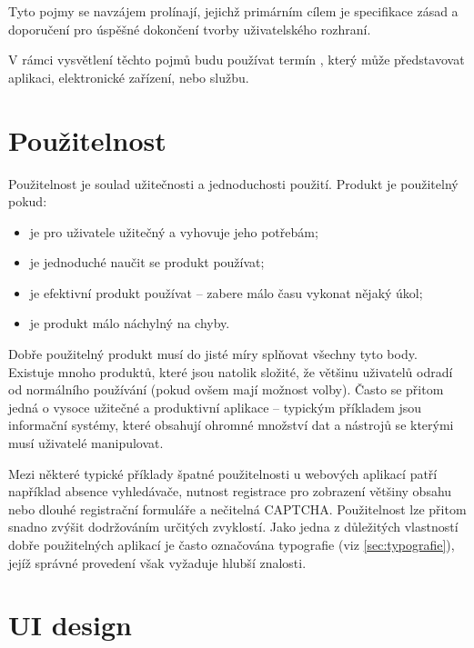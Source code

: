 Tyto pojmy se navzájem prolínají, jejichž primárním cílem je specifikace zásad a doporučení pro úspěšné dokončení tvorby uživatelského rozhraní.

V rámci vysvětlení těchto pojmů budu používat termín , který může představovat aplikaci, elektronické zařízení, nebo službu.

\section{Použitelnost}
\label{sec:usability}

Použitelnost je soulad užitečnosti a jednoduchosti použití. Produkt je použitelný pokud:

\begin{itemize}
    \item je pro uživatele užitečný a vyhovuje jeho potřebám;
    \item je jednoduché naučit se produkt používat;
    \item je efektivní produkt používat -- zabere málo času vykonat nějaký úkol;
    \item je produkt málo náchylný na chyby.
\end{itemize}

Dobře použitelný produkt musí do jisté míry splňovat všechny tyto body. Existuje mnoho produktů, které jsou natolik složité, že většinu uživatelů odradí od normálního používání (pokud ovšem mají možnost volby). Často se přitom jedná o vysoce užitečné a produktivní aplikace -- typickým příkladem jsou informační systémy, které obsahují ohromné množství dat a nástrojů se kterými musí uživatelé manipulovat.

Mezi některé typické příklady špatné použitelnosti u webových aplikací patří například absence vyhledávače, nutnost registrace pro zobrazení většiny obsahu nebo dlouhé registrační formuláře a nečitelná CAPTCHA\footnotemark[1]. Použitelnost lze přitom snadno zvýšit dodržováním určitých zvyklostí. Jako jedna z důležitých vlastností dobře použitelných aplikací je často označována typografie (viz \ref{sec:typografie}), jejíž správné provedení však vyžaduje hlubší znalosti.


\section{UI design}
\label{sec:uidesign}

